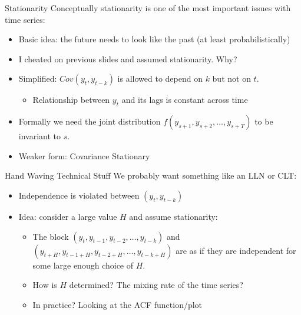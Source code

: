 \documentclass[aspectratio=169]{beamer}
\begin{document}
\begin{frame}{Stationarity}
Conceptually \alert{stationarity} is one of the most important issues with time series:
\begin{itemize}
\item Basic idea: the future needs to look like the past (at least probabilistically)
\item I cheated on previous slides and assumed stationarity. Why?
\item Simplified: $Cov(y_t,y_{t-k})$ is allowed to depend on $k$ but not on $t$.
\begin{itemize}
\item Relationship between $y_t$ and its lags is constant across time
\end{itemize}
\item Formally we need the joint distribution $f(y_{s+1},y_{s+2},\ldots,y_{s+T})$ to be invariant to $s$.
\item Weaker form: Covariance Stationary
\end{itemize}
\end{frame}

\begin{frame}{Hand Waving Technical Stuff}
We probably want something like an LLN or CLT:
\begin{itemize}
\item \alert{Independence} is violated between $(y_t,y_{t-k})$
\item Idea: consider a large value $H$ and assume \alert{stationarity}:
\begin{itemize}
\item The block $(y_t,y_{t-1},y_{t-2},\ldots,y_{t-k})$ and $(y_{t+H},y_{t-1+H},y_{t-2+H},\ldots,y_{t-k+H})$ are as if they are independent for some large enough choice of $H$.
\item How is $H$ determined? The \alert{mixing rate} of the time series?
\item In practice? Looking at the ACF function/plot
\end{itemize}
\end{itemize}
\end{frame}
\end{document}
